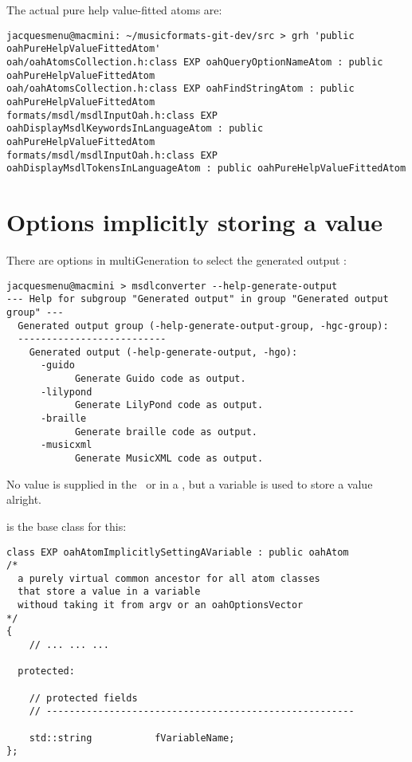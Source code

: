 The actual pure help value-fitted atoms are:
\begin{lstlisting}[language=Terminal]
jacquesmenu@macmini: ~/musicformats-git-dev/src > grh 'public oahPureHelpValueFittedAtom'
oah/oahAtomsCollection.h:class EXP oahQueryOptionNameAtom : public oahPureHelpValueFittedAtom
oah/oahAtomsCollection.h:class EXP oahFindStringAtom : public oahPureHelpValueFittedAtom
formats/msdl/msdlInputOah.h:class EXP oahDisplayMsdlKeywordsInLanguageAtom : public oahPureHelpValueFittedAtom
formats/msdl/msdlInputOah.h:class EXP oahDisplayMsdlTokensInLanguageAtom : public oahPureHelpValueFittedAtom
\end{lstlisting}


\section{Options implicitly storing a value}

There are options in multiGeneration to select the generated output :
\begin{lstlisting}[language=Terminal]
jacquesmenu@macmini > msdlconverter --help-generate-output
--- Help for subgroup "Generated output" in group "Generated output group" ---
  Generated output group (-help-generate-output-group, -hgc-group):
  --------------------------
    Generated output (-help-generate-output, -hgo):
      -guido
            Generate Guido code as output.
      -lilypond
            Generate LilyPond code as output.
      -braille
            Generate braille code as output.
      -musicxml
            Generate MusicXML code as output.
\end{lstlisting}

No value is supplied in the \CLI\ or in a , but a variable is used to store a value alright.

 is the base class for this:
\begin{lstlisting}[language=CPlusPlus]
class EXP oahAtomImplicitlySettingAVariable : public oahAtom
/*
  a purely virtual common ancestor for all atom classes
  that store a value in a variable
  withoud taking it from argv or an oahOptionsVector
*/
{
	// ... ... ...

  protected:

    // protected fields
    // ------------------------------------------------------

    std::string           fVariableName;
};
\end{lstlisting}

